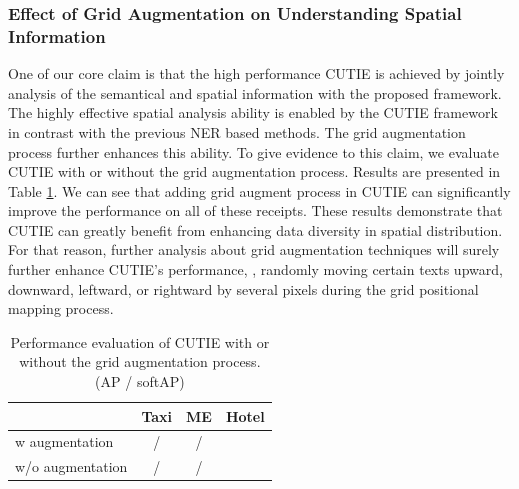 \documentclass[10pt,twocolumn,letterpaper]{article}
\begin{document}
\subsubsection{Effect of Grid Augmentation on Understanding Spatial Information}
One of our core claim is that the high performance CUTIE is achieved by jointly analysis of the semantical and spatial information with the proposed framework. The highly effective spatial analysis ability is enabled by the CUTIE framework in contrast with the previous NER based methods. The grid augmentation process further enhances this ability. To give evidence to this claim, we evaluate CUTIE with or without the grid augmentation process. Results are presented in Table \ref{tab:augmentation}. We can see that adding grid augment process in CUTIE can significantly improve the performance on all of these receipts. These results demonstrate that CUTIE can greatly benefit from enhancing data diversity in spatial distribution. For that reason, further analysis about grid augmentation techniques will surely further enhance CUTIE's performance, \eg, randomly moving certain texts upward, downward, leftward, or rightward by several pixels during the grid positional mapping process. 
\begin{table}
	\caption{Performance evaluation of CUTIE with or without the grid augmentation process. (AP / softAP)}
\begin{center}
\begin{tabular}{l | c | c | c}
	 & Taxi & ME & Hotel \\
	\hline
	w augmentation & / & / & \\
	w/o augmentation & / & / & \\
\end{tabular}
\end{center}
	\label{tab:augmentation}
\end{table}
\end{document}
